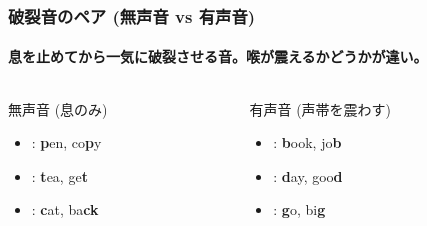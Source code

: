 \documentclass[aspectratio=169,xcolor={dvipsnames,table}]{beamer}
\begin{document}
\begin{frame}
    \frametitle{破裂音のペア (無声音 vs 有声音)}
    \framesubtitle{息を止めてから一気に破裂させる音。喉が震えるかどうかが違い。}
    \begin{columns}[T,totalwidth=\textwidth]
        \begin{column}{.45\textwidth}
            \begin{alertblock}{無声音 (息のみ)}
                \begin{itemize}
                    \item {} : \textbf{p}en, co\textbf{p}y
                    \item {} : \textbf{t}ea, ge\textbf{t}
                    \item {} : \textbf{c}at, ba\textbf{ck}
                \end{itemize}
            \end{alertblock}
        \end{column}
        \begin{column}{.45\textwidth}
            \begin{block}{有声音 (声帯を震わす)}
                \begin{itemize}
                    \item {} : \textbf{b}ook, jo\textbf{b}
                    \item {} : \textbf{d}ay, goo\textbf{d}
                    \item {} : \textbf{g}o, bi\textbf{g}
                \end{itemize}
            \end{block}
        \end{column}
    \end{columns}
\end{frame}
\end{document}
